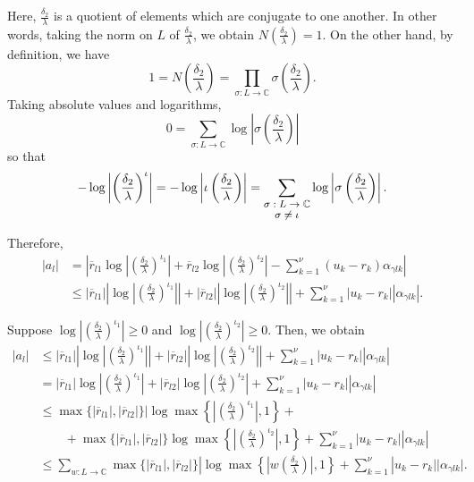 Here, $\frac{\delta_2}{\lambda}$ is a quotient of elements which are conjugate to one another. In other words, taking the norm on $L$ of $\frac{\delta_2}{\lambda}$, we obtain $N\left(\frac{\delta_2}{\lambda}\right) = 1.$ On the other hand, by definition, we have 
\[1 = N\left(\frac{\delta_2}{\lambda}\right) = \prod_{\sigma: L \to \mathbb{C}} \sigma \left(\frac{\delta_2}{\lambda}\right).\]
Taking absolute values and logarithms, 
\[0 = \sum_{\sigma: L \to \mathbb{C}} \log\left|\sigma \left(\frac{\delta_2}{\lambda}\right)\right|\]
so that
\[-\log\left|\left(\frac{\delta_2}{\lambda}\right)^{\iota}\right| = -\log\left|\iota \left(\frac{\delta_2}{\lambda}\right)\right| = \sum_{\shortstack{\footnotesize $\sigma: L \to \mathbb{C} $\\ \footnotesize $ \sigma \neq \iota$}} \log\left|\sigma \left(\frac{\delta_2}{\lambda}\right)\right|.\]

Therefore,
\begin{align*}
|a_l| 	& = \left|\overline{r}_{l1}\log\left|\left(\frac{\delta_2}{\lambda}\right)^{\iota_1}\right| + \overline{r}_{l2}\log\left|\left(\frac{\delta_2}{\lambda}\right)^{\iota_2}\right| - \sum_{k=1}^{\nu}(u_k-r_k)\alpha_{\gamma l k}\right|\\
	& \leq |\overline{r}_{l1}|\left|\log\left|\left(\frac{\delta_2}{\lambda}\right)^{\iota_1}\right|\right| + |\overline{r}_{l2}|\left|\log\left|\left(\frac{\delta_2}{\lambda}\right)^{\iota_2}\right|\right| + \sum_{k=1}^{\nu}|u_k-r_k||\alpha_{\gamma l k}|.
\end{align*}

Suppose $\log\left|\left(\frac{\delta_2}{\lambda}\right)^{\iota_1}\right| \geq 0$ and $\log\left|\left(\frac{\delta_2}{\lambda}\right)^{\iota_2}\right| \geq 0$. Then, we obtain
\begin{align*}
|a_l| 	& \leq |\overline{r}_{l1}|\left|\log\left|\left(\frac{\delta_2}{\lambda}\right)^{\iota_1}\right|\right| + |\overline{r}_{l2}|\left|\log\left|\left(\frac{\delta_2}{\lambda}\right)^{\iota_2}\right|\right| + \sum_{k=1}^{\nu}|u_k-r_k||\alpha_{\gamma l k}|\\
	& = |\overline{r}_{l1}|\log\left|\left(\frac{\delta_2}{\lambda}\right)^{\iota_1}\right| + |\overline{r}_{l2}|\log\left|\left(\frac{\delta_2}{\lambda}\right)^{\iota_2}\right| + \sum_{k=1}^{\nu}|u_k-r_k||\alpha_{\gamma l k}|\\
	& \leq \max\{|\overline{r}_{l1}|, |\overline{r}_{l2}|\}|\log\max\left\{\left|\left(\frac{\delta_2}{\lambda}\right)^{\iota_1}\right|,1\right\} + \\
	& \quad \quad +\max\{|\overline{r}_{l1}|, |\overline{r}_{l2}|\}\log\max\left\{\left|\left(\frac{\delta_2}{\lambda}\right)^{\iota_2}\right|,1\right\} + \sum_{k=1}^{\nu}|u_k-r_k||\alpha_{\gamma l k}|\\
	&  \leq \sum_{w: L \to \mathbb{C}}\max\{|\overline{r}_{l1}|, |\overline{r}_{l2}|\}|\log\max\left\{\left|w\left(\frac{\delta_2}{\lambda}\right)\right|,1\right\} + \sum_{k=1}^{\nu}|u_k-r_k||\alpha_{\gamma l k}|.
\end{align*}

